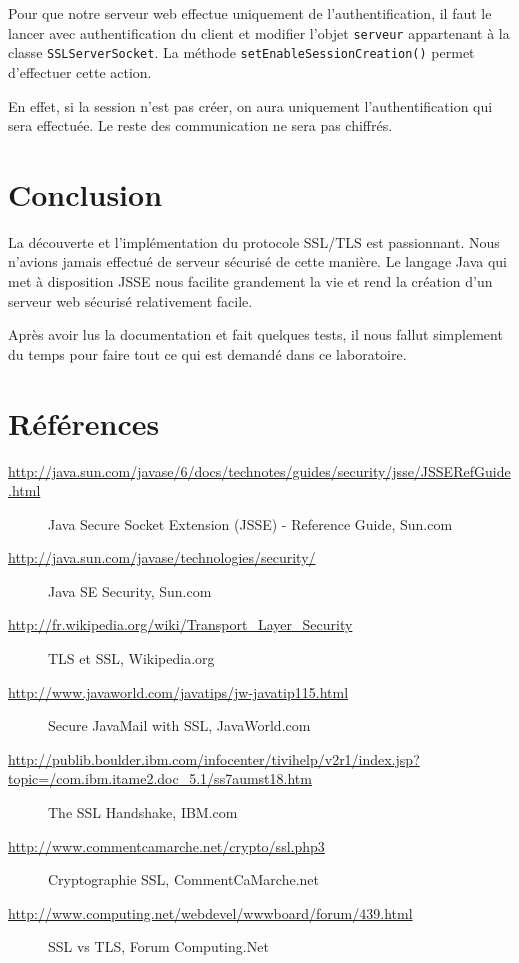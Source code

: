 \documentclass[10pt,a4paper,titlepage]{article}
\begin{document}
Pour que notre serveur web effectue uniquement de l'authentification, il faut le lancer avec authentification du client et modifier l'objet \texttt{serveur} appartenant à la classe \texttt{SSLServerSocket}. La méthode \texttt{setEnableSessionCreation()} permet d'effectuer cette action.

En effet, si la session n'est pas créer, on aura uniquement l'authentification qui sera effectuée. Le reste des communication ne sera pas chiffrés.

\section{Conclusion}

La découverte et l'implémentation du protocole SSL/TLS est passionnant. Nous n'avions jamais effectué de serveur sécurisé de cette manière. Le langage Java qui met à disposition JSSE nous facilite grandement la vie et rend la création d'un serveur web sécurisé relativement facile. 

Après avoir lus la documentation et fait quelques tests, il nous fallut simplement du temps pour faire tout ce qui est demandé dans ce laboratoire.


\section{Références}

{\scriptsize
\begin{description}
	\item[\url{http://java.sun.com/javase/6/docs/technotes/guides/security/jsse/JSSERefGuide.html}]	Java Secure Socket Extension (JSSE) - Reference Guide, Sun.com
	\item[\url{http://java.sun.com/javase/technologies/security/}] Java SE Security, Sun.com
	\item[\url{http://fr.wikipedia.org/wiki/Transport_Layer_Security}] {TLS et SSL, Wikipedia.org}
	\item[\url{http://www.javaworld.com/javatips/jw-javatip115.html}] Secure JavaMail with SSL, JavaWorld.com
	\item[\url{http://publib.boulder.ibm.com/infocenter/tivihelp/v2r1/index.jsp?topic=/com.ibm.itame2.doc_5.1/ss7aumst18.htm}] The SSL Handshake, IBM.com
	\item[\url{http://www.commentcamarche.net/crypto/ssl.php3}] Cryptographie SSL, CommentCaMarche.net
	\item[\url{http://www.computing.net/webdevel/wwwboard/forum/439.html}] SSL vs TLS, Forum Computing.Net
\end{description}
}
\end{document}
